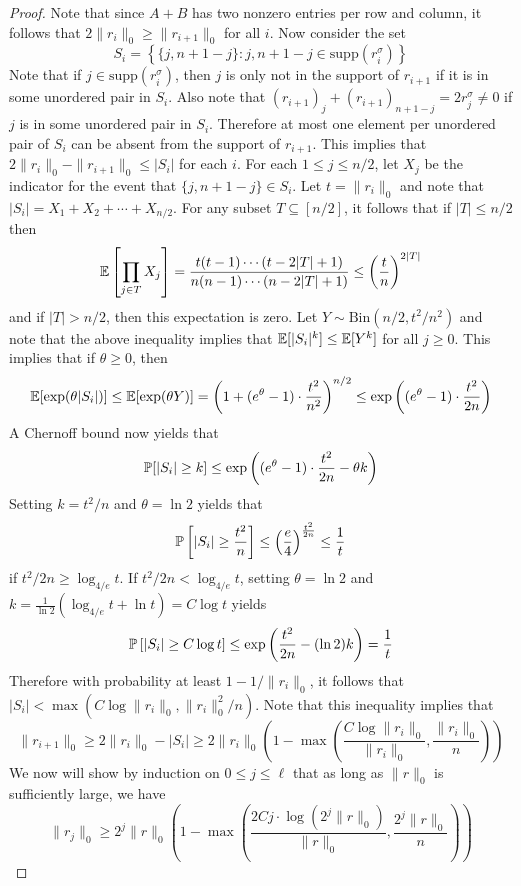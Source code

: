 \begin{proof}
Note that since $A + B$ has two nonzero entries per row and column, it follows that $2\| r_i \|_0 \ge \| r_{i+1} \|_0$ for all $i$. Now consider the set
$$S_i = \left\{ \{j, n + 1 - j\} : j, n+1 - j \in \text{supp}\left(r_i^\sigma\right) \right\}$$
Note that if $j \in \text{supp}\left(r_i^\sigma\right)$, then $j$ is only not in the support of $r_{i+1}$ if it is in some unordered pair in $S_i$. Also note that $(r_{i+1})_j + (r_{i+1})_{n+1 - j} = 2r^\sigma_j \neq 0$ if $j$ is in some unordered pair in $S_i$. Therefore at most one element per unordered pair of $S_i$ can be absent from the support of $r_{i+1}$. This implies that $2\| r_i \|_0 - \| r_{i+1} \|_0 \le |S_i|$ for each $i$. For each $1 \le j \le n/2$, let $X_j$ be the indicator for the event that $\{j, n+1 - j\} \in S_i$. Let $t = \| r_i \|_0$ and note that $|S_i| = X_1 + X_2 + \cdots + X_{n/2}$. For any subset $T \subseteq [n/2]$, it follows that if $|T| \le n/2$ then
$$\mathbb{E}\left[ \prod_{j \in T} X_j \right] = \frac{t(t-1)\cdots(t - 2|T| + 1)}{n(n-1)\cdots(n - 2|T| + 1)} \le \left( \frac{t}{n} \right)^{2|T|}$$
and if $|T| > n/2$, then this expectation is zero. Let $Y \sim \text{Bin}(n/2, t^2/n^2)$ and note that the above inequality implies that $\mathbb{E}[|S_i|^k] \le \mathbb{E}[Y^k]$ for all $j \ge 0$. This implies that if $\theta \ge 0$, then
$$\mathbb{E}[\exp(\theta |S_i|)] \le \mathbb{E}[\exp(\theta Y)] = \left( 1 + (e^\theta - 1) \cdot \frac{t^2}{n^2} \right)^{n/2} \le \exp\left( (e^\theta - 1) \cdot \frac{t^2}{2n} \right)$$
A Chernoff bound now yields that
$$\mathbb{P}[|S_i| \ge k] \le \exp\left( (e^\theta - 1) \cdot \frac{t^2}{2n} - \theta k \right)$$
Setting $k = t^2/n$ and $\theta = \ln 2$ yields that
$$\mathbb{P}\left[|S_i| \ge \frac{t^2}{n}\right] \le \left( \frac{e}{4} \right)^{\frac{t^2}{2n}} \le \frac{1}{t}$$
if $t^2/2n \ge \log_{4/e} t$. If $t^2/2n < \log_{4/e} t$, setting $\theta = \ln 2$ and $k = \frac{1}{\ln 2} \left( \log_{4/e} t + \ln t \right) = C\log t$ yields
$$\mathbb{P}\left[|S_i| \ge C \log t \right] \le \exp\left( \frac{t^2}{2n} - (\ln 2) k \right) = \frac{1}{t}$$
Therefore with probability at least $1 - 1/\| r_i \|_0$, it follows that $|S_i| < \max(C\log \| r_i \|_0, \| r_i \|_0^2/n)$. Note that this inequality implies that
$$\| r_{i+1} \|_0 \ge 2\| r_i \|_0 - |S_i| \ge 2\| r_i \|_0 \left(1 - \max\left(\frac{C \log \| r_i \|_0}{\| r_i\|_0}, \frac{\| r_i \|_0}{n}\right) \right)$$
We now will show by induction on $0 \le j \le \ell$ that as long as $\|r \|_0$ is sufficiently large, we have
\begin{equation}
\| r_j \|_0 \ge 2^j \| r \|_0 \left( 1 - \max\left(\frac{2Cj \cdot \log (2^j \| r \|_0)}{\| r \|_0}, \frac{2^j \| r \|_0}{n}\right) \right)

\end{equation}
\end{proof}
